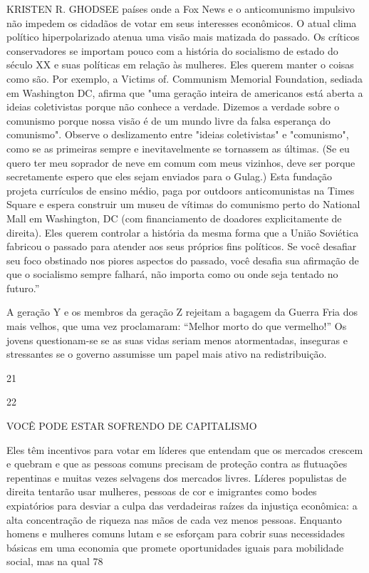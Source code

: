 KRISTEN R. GHODSEE países onde a Fox News e o anticomunismo impulsivo não impedem os cidadãos de votar em seus interesses econômicos. O atual clima político hiperpolarizado atenua uma visão mais matizada do passado. Os críticos conservadores se importam pouco com a história do socialismo de estado do século XX e suas políticas em relação às mulheres. Eles querem manter o coisas como são. Por exemplo, a Victims of. Communism Memorial Foundation, sediada em Washington DC, afirma que "uma geração inteira de americanos está aberta a ideias coletivistas porque não conhece a verdade. Dizemos a verdade sobre o comunismo porque nossa visão é de um mundo livre da falsa esperança do comunismo". Observe o deslizamento entre "ideias coletivistas" e "comunismo", como se as primeiras sempre e inevitavelmente se tornassem as últimas. (Se eu quero ter meu soprador de neve em comum com meus vizinhos, deve ser porque secretamente espero que eles sejam enviados para o Gulag.) Esta fundação projeta currículos de ensino médio, paga por outdoors anticomunistas na Times Square e espera construir um museu de vítimas do comunismo perto do National Mall em Washington, DC (com financiamento de doadores explicitamente de direita). Eles querem controlar a história da mesma forma que a União Soviética fabricou o passado para atender aos seus próprios fins políticos. Se você desafiar seu foco obstinado nos piores aspectos do passado, você desafia sua afirmação de que o socialismo sempre falhará, não importa como ou onde seja tentado no futuro.”
 \par 
A geração Y e os membros da geração Z rejeitam a bagagem da Guerra Fria dos mais velhos, que uma vez proclamaram: “Melhor morto do que vermelho!” Os jovens questionam-se se as suas vidas seriam menos atormentadas, inseguras e stressantes se o governo assumisse um papel mais ativo na redistribuição.
 \par 
21
 \par 
22
 \par 
VOCÊ PODE ESTAR SOFRENDO DE CAPITALISMO
 \par 
Eles têm incentivos para votar em líderes que entendam que os mercados crescem e quebram e que as pessoas comuns precisam de proteção contra as flutuações repentinas e muitas vezes selvagens dos mercados livres. Líderes populistas de direita tentarão usar mulheres, pessoas de cor e imigrantes como bodes expiatórios para desviar a culpa das verdadeiras raízes da injustiça econômica: a alta concentração de riqueza nas mãos de cada vez menos pessoas. Enquanto homens e mulheres comuns lutam e se esforçam para cobrir suas necessidades básicas em uma economia que promete oportunidades iguais para mobilidade social, mas na qual 78%
